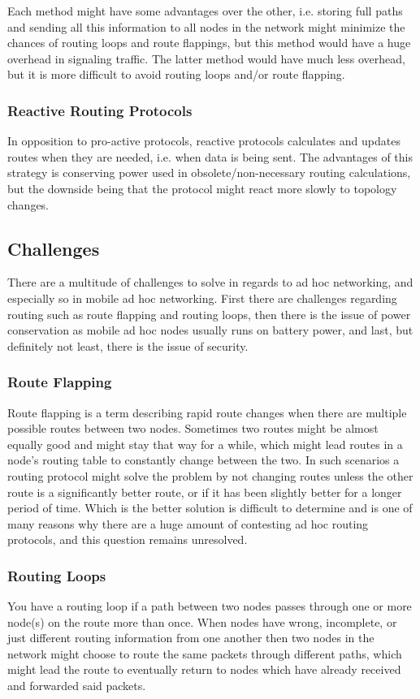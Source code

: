 Each method might have some advantages over the other, i.e. storing full paths
and sending all this information to all nodes in the network might minimize the
chances of routing loops and route flappings, but this method would have a huge
overhead in signaling traffic. The latter method would have much less overhead,
but it is more difficult to avoid routing loops and/or route flapping.

\subsubsection*{Reactive Routing Protocols}
In opposition to pro-active protocols, reactive protocols calculates and updates
routes when they are needed, i.e. when data is being sent. The advantages of
this strategy is conserving power used in obsolete/non-necessary routing
calculations, but the downside being that the protocol might react more slowly
to topology changes.

\subsection{Challenges}
There are a multitude of challenges to solve in regards to ad hoc networking,
and especially so in mobile ad hoc networking. First there are challenges
regarding routing such as route flapping and routing loops, then there is the
issue of power conservation as mobile ad hoc nodes usually runs on battery
power, and last, but definitely not least, there is the issue of security.

\subsubsection*{Route Flapping}
Route flapping is a term describing rapid route changes when there are multiple
possible routes between two nodes. Sometimes two routes might be almost equally
good and might stay that way for a while, which might lead routes in a node's
routing table to constantly change between the two. In such scenarios a routing
protocol might solve the problem by not changing routes unless the other route
is a significantly better route, or if it has been slightly better for a longer
period of time. Which is the better solution is difficult to determine and is
one of many reasons why there are a huge amount of contesting ad hoc routing
protocols, and this question remains unresolved.

\subsubsection*{Routing Loops}
You have a routing loop if a path between two nodes passes through one or more
node(s) on the route more than once. When nodes have wrong, incomplete, or just
different routing information from one another then two nodes in the network
might choose to route the same packets through different paths, which might
lead the route to eventually return to nodes which have already received and
forwarded said packets.

